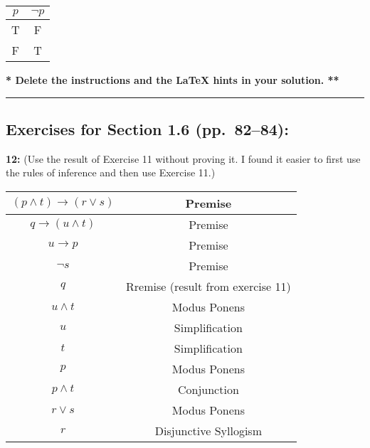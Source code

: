 \documentclass[12pt]{article}  %
\newcommand{\NOT}{\neg}
\newcommand{\AND}{\wedge}
\newcommand{\OR}{\vee}
\newcommand{\IMPLIES}{\rightarrow}
\begin{document}
\begin{center}
\begin{tabular}{|c|c|}  %
\hline                  %
$p$ & $\NOT p$ \\       %
\hline
\hline
T & F \\
\hline
F & T \\
\hline
\end{tabular}
\end{center}

{\bf ** Delete the instructions and the LaTeX hints in your solution. **}

\rule{6in}{.1pt}       %


\subsection*{Exercises for Section 1.6 (pp.\ 82--84):}     

\noindent
{\bf 12:}  (Use the result of Exercise 11 without proving it.  I found it
easier to first use the rules of inference and then use Exercise 11.)

\begin{center}

\begin{tabular}{|c|c|}  %
\hline                  %
$(p \AND t) \IMPLIES (r \OR s)$ & Premise \\       %
\hline
$q \IMPLIES (u \AND t)$ & Premise \\
\hline
$u \IMPLIES p$ & Premise \\
\hline
$\NOT s$ & Premise \\
\hline
$q$ & Rremise (result from exercise 11)\\
\hline
$u \AND t$ & Modus Ponens\\
\hline
$u$ & Simplification\\
\hline
$t$ & Simplification\\
\hline
$p$ & Modus Ponens\\
\hline
$p \AND t$ & Conjunction\\
\hline
$r \OR s$ & Modus Ponens\\
\hline
$r$ & Disjunctive Syllogism\\
\hline
\end{tabular}

\end{center}
\end{document}
